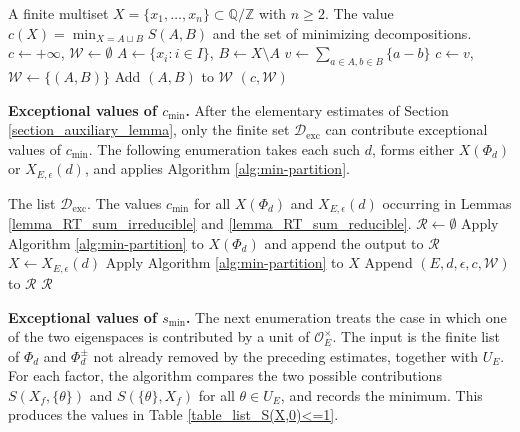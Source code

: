 \documentclass[11pt]{amsart}
\theoremstyle{plain}
\theoremstyle{definition}
\numberwithin{equation}{section}
\def\OO{\mathscr{O}}
\begin{document}
\begin{algorithm}[H]
\caption{Minimum over non-trivial bipartitions}\label{alg:min-partition}
\begin{algorithmic}[1]
\Require A finite multiset $X=\{x_1,\ldots,x_n\}\subset \mathbb Q/\mathbb Z$ with $n\geq2$.
\Ensure The value $c(X)=\min_{X=A\sqcup B}S(A,B)$ and the set of minimizing decompositions.
\State $c\gets +\infty$, $\mathcal W\gets\emptyset$
  \State $A\gets\{x_i:i\in I\}$, $B\gets X\setminus A$
  \State $v\gets \sum_{a\in A,b\in B}\{a-b\}$
    \State $c\gets v$, $\mathcal W\gets\{(A,B)\}$
    \State Add $(A,B)$ to $\mathcal W$
  \EndIf
\EndFor
\State \Return $(c,\mathcal W)$
\end{algorithmic}
\end{algorithm}

\noindent \textbf{Exceptional values of $c_{\min}$.}
After the elementary estimates of Section \ref{section_auxiliary_lemma}, only the finite set $\mathcal{D}_{\mathrm{exc}}$ can contribute exceptional values of $c_{\min}$.  The following enumeration takes each such $d$, forms either $X(\Phi_d)$ or $X_{E,\epsilon}(d)$,
and applies Algorithm \ref{alg:min-partition}.  
\begin{algorithm}[H]
\caption{Exceptional values of $c_{\min}$}\label{alg:cmin-exceptional}
\begin{algorithmic}[1]
\Require The list $\mathcal{D}_{\mathrm{exc}}$.
\Ensure The values $c_{\min}$ for all  $X(\Phi_d)$ and $X_{E,\epsilon}(d)$
occurring in Lemmas \ref{lemma_RT_sum_irreducible} and
\ref{lemma_RT_sum_reducible}.
\State $\mathcal R\gets\emptyset$
  \State Apply Algorithm \ref{alg:min-partition} to $X(\Phi_d)$ and append the output to $\mathcal R$
      \State $X\gets X_{E,\epsilon}(d)$
        \State Apply Algorithm \ref{alg:min-partition} to $X$
        \State Append $(E,d,\epsilon,c,\mathcal W)$ to $\mathcal R$
      \EndIf
    \EndFor
  \EndFor
\EndFor
\State \Return $\mathcal R$
\end{algorithmic}
\end{algorithm}


\noindent \textbf{Exceptional values of $s_{\min}$.}
The next enumeration treats the case in which one of the two eigenspaces is contributed by a unit of $\OO_E^\times$.  The input is the finite list of $\Phi_d$ and $\Phi_d^\pm$ not already removed by the preceding estimates, together with $U_E$.  For each factor, the algorithm compares the two possible contributions $S(X_f,\{\theta\})$ and $S(\{\theta\},X_f)$ for all $\theta\in U_E$, and records the minimum.
This produces the values in Table \ref{table_list_S(X,0)<=1}.
\end{document}
